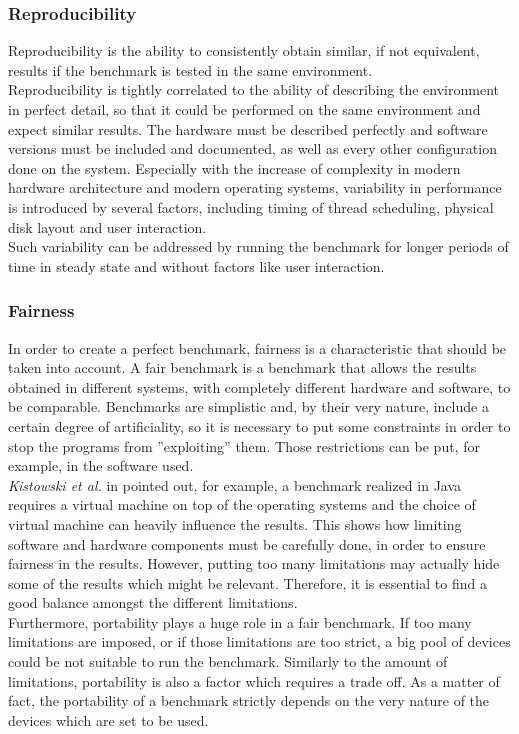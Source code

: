 \subsubsection{Reproducibility}
Reproducibility is the ability to consistently obtain similar, if not equivalent, results if the benchmark is tested in the same environment. \cite{how_to_bench}\\
Reproducibility is tightly correlated to the ability of describing the environment in perfect detail, so that it could be performed on the same environment and expect similar results. The hardware must be described perfectly and software versions must be included and documented, as well as every other configuration done on the system. Especially with the increase of complexity in modern hardware architecture and modern operating systems, variability in performance is introduced by several factors, including  timing of thread scheduling, physical disk layout and user interaction. \cite{how_to_bench}\\
Such variability can be addressed by running the benchmark for longer periods of time in steady state and without factors like user interaction. 


\subsubsection{Fairness}
In order to create a perfect benchmark, fairness is a characteristic that should be taken into account. A fair benchmark is a benchmark that allows the results obtained in different systems, with completely different hardware and software, to be comparable. Benchmarks are simplistic and, by their very nature, include a certain degree of artificiality, so it is necessary to put some constraints in order to stop the programs from ''exploiting'' them. Those restrictions can be put, for example, in the software used.\\ 
\textit{Kistowski et al.} in \cite{how_to_bench} pointed out, for example, a benchmark realized in Java requires a virtual machine on top of the operating systems and the choice of virtual machine can heavily influence the results. This shows how limiting software and hardware components must be carefully done, in order to ensure fairness in the results. However, putting too many limitations may actually hide some of the results which might be relevant. \cite{how_to_bench} Therefore, it is essential to find a good balance amongst the different limitations. \\
Furthermore, portability plays a huge role in a fair benchmark. If too many limitations are imposed, or if those limitations are too strict, a big pool of devices could be not suitable to run the benchmark. Similarly to the amount of limitations, portability is also a factor which requires a trade off. As a matter of fact, the portability of a benchmark strictly depends on the very nature of the devices which are set to be used. 

